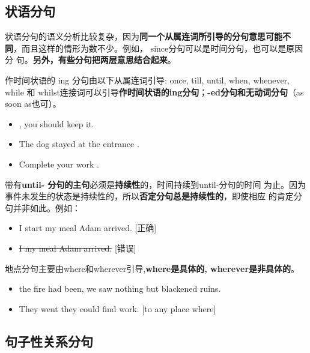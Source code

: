 

\subsection{状语分句}

状语分句的语义分析比较复杂，因为\textbf{同一个从属连词所引导的分句意思可能不
  同}，而且这样的情形为数不少。例如， since分句可以是时间分句，也可以是原因分
句。\textbf{另外，有些分句把两层意思结合起来}。

作时间状语的 ing 分句由以下从属连词引导: once, till, until, when, whenever,
while 和 whilst连接词可以引导\textbf{作时间状语的ing分句}；\textbf{-ed分句和无动词分句}（as soon
as也可）。
\begin{itemize}
\item {}, you should keep it.
\item The dog stayed at the entrance .
\item Complete your work .
\end{itemize}

带有\textbf{until- 分句的主句}必须是\textbf{持续性}的，时间持续到until-分句的时间
为止。因为事件未发生的状态是持续性的，所以\textbf{否定分句总是持续性的}，即使相应
的肯定分句并非如此。例如：
\begin{itemize}
\item I  start my meal  Adam arrived. [正确]
\item \sout{I  my meal  Adam arrived.} [错误]
\end{itemize}


地点分句主要由where和wherever引导,\textbf{where是具体的, wherever是非具体的}。
\begin{itemize}
\item {} the fire had been, we saw nothing but blackened ruins.

\item They went  they could find work. [to any place where]
\end{itemize}

\subsection{句子性关系分句}

